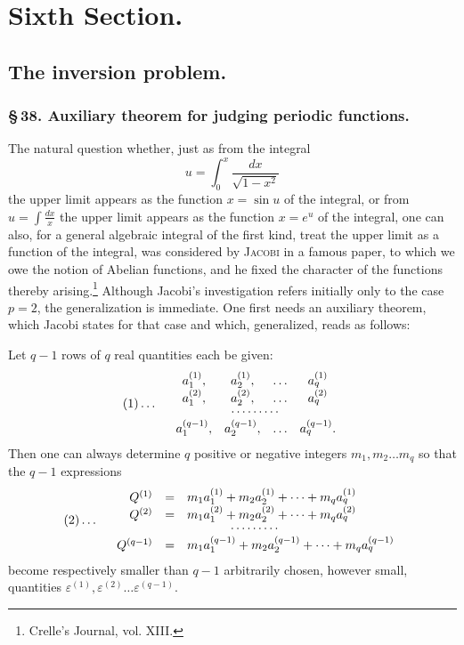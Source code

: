 \documentclass[10pt]{article}
\begin{document}
\section*{Sixth Section.}
\subsection*{The inversion problem.}

\subsubsection*{\S\,38. Auxiliary theorem for judging periodic functions.}

The natural question whether, just as from the integral
\[u=\int_0^x\frac{dx}{\sqrt{1-x^2}}
\]
the upper limit appears as the function \(x=\sin u\) of the integral, or from \(u=\int\frac{dx}{x}\) the upper limit appears as the function \(x=e^u\) of the integral, one can also, for a general algebraic integral of the first kind, treat the upper limit as a function of the integral, was considered by \textsc{Jacobi} in a famous paper, to which we owe the notion of Abelian functions, and he fixed the character of the functions thereby arising.\footnote{Crelle's Journal, vol. XIII.} Although Jacobi's investigation refers initially only to the case \(p=2\), the generalization is immediate. One first needs an auxiliary theorem, which Jacobi states for that case and which, generalized, reads as follows:

Let \(q-1\) rows of \(q\) real quantities each be given:
\[
(1)\ldots\quad
\begin{array}{cccc}
a_1^{(1)},&a_2^{(1)},&\ldots&a_q^{(1)}\\
a_1^{(2)},&a_2^{(2)},&\ldots&a_q^{(2)}\\[-0.15em]
\multicolumn{4}{c}{\cdots\cdots\cdots}\\
a_1^{(q-1)},&a_2^{(q-1)},&\ldots&a_q^{(q-1)}.
\end{array}
\]
Then one can always determine \(q\) positive or negative integers \(m_1,m_2\ldots m_q\) so that the \(q-1\) expressions
\[
(2)\ldots\quad
\begin{array}{rcl}
Q^{(1)}&=&m_1a_1^{(1)}+m_2a_2^{(1)}+\cdots+m_qa_q^{(1)}\\
Q^{(2)}&=&m_1a_1^{(2)}+m_2a_2^{(2)}+\cdots+m_qa_q^{(2)}\\[-0.15em]
\multicolumn{3}{c}{\cdots\cdots\cdots}\\
Q^{(q-1)}&=&m_1a_1^{(q-1)}+m_2a_2^{(q-1)}+\cdots+m_qa_q^{(q-1)}
\end{array}
\]
become respectively smaller than \(q-1\) arbitrarily chosen, however small, quantities \(\varepsilon^{(1)},\varepsilon^{(2)}\ldots\varepsilon^{(q-1)}\).
\end{document}
